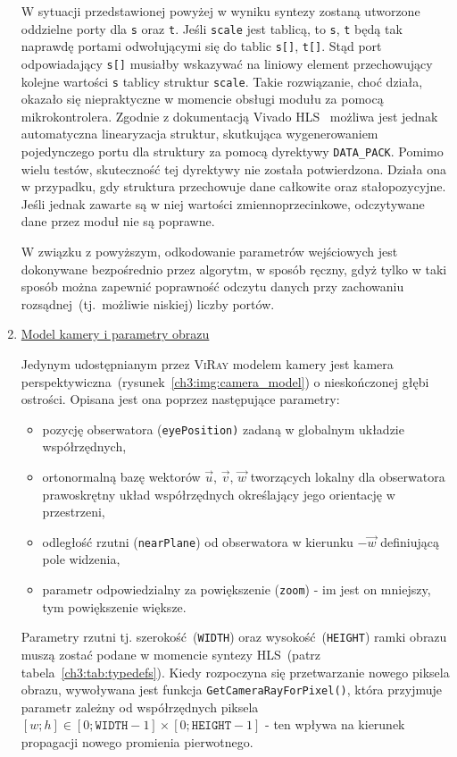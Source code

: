 \begin{enumerate}
W sytuacji przedstawionej powyżej w wyniku syntezy zostaną utworzone oddzielne porty dla \texttt{s} oraz \texttt{t}. Jeśli \texttt{scale} jest tablicą, to \texttt{s}, \texttt{t} będą tak naprawdę portami odwołującymi się do tablic \texttt{s[]}, \texttt{t[]}. Stąd port odpowiadający \texttt{s[]} musiałby wskazywać na liniowy element przechowujący kolejne wartości \texttt{s} tablicy struktur \texttt{scale}. Takie rozwiązanie, choć działa, okazało się niepraktyczne w momencie obsługi modułu za pomocą mikrokontrolera. Zgodnie z dokumentacją Vivado HLS~\cite{UG902} możliwa jest jednak automatyczna linearyzacja struktur, skutkująca wygenerowaniem pojedynczego portu dla struktury za pomocą dyrektywy \texttt{DATA\_PACK}. Pomimo wielu testów, skuteczność tej dyrektywy nie została potwierdzona. Działa ona w przypadku, gdy struktura przechowuje dane całkowite oraz stałopozycyjne. Jeśli jednak zawarte są w niej wartości zmiennoprzecinkowe, odczytywane dane przez moduł nie są poprawne. 

W związku z powyższym, odkodowanie parametrów wejściowych jest dokonywane bezpośrednio przez algorytm, w sposób ręczny, gdyż tylko w taki sposób można zapewnić poprawność odczytu danych przy zachowaniu rozsądnej~(tj.~możliwie niskiej) liczby portów.


\item \underline{Model kamery i parametry obrazu}

Jedynym udostępnianym przez \textsc{ViRay} modelem kamery jest kamera perspektywiczna~(rysunek~\ref{ch3:img:camera_model}) o nieskończonej głębi ostrości. Opisana jest ona poprzez następujące parametry:
\begin{itemize}
\item pozycję obserwatora (\texttt{eyePosition)} zadaną w globalnym układzie współrzędnych,
\item ortonormalną bazę wektorów $\vec{u}$, $\vec{v}$, $\vec{w}$ tworzących lokalny dla obserwatora prawoskrętny układ współrzędnych określający jego orientację w przestrzeni,
\item odległość rzutni (\texttt{nearPlane}) od obserwatora w kierunku $-\vec{w}$ definiującą pole widzenia,
\item parametr odpowiedzialny za powiększenie (\texttt{zoom}) - im jest on mniejszy, tym powiększenie większe.
\end{itemize}
Parametry rzutni tj. szerokość~(\texttt{WIDTH}) oraz wysokość~(\texttt{HEIGHT}) ramki obrazu muszą zostać podane w momencie syntezy HLS~(patrz tabela~\ref{ch3:tab:typedefs}). Kiedy rozpoczyna się przetwarzanie nowego piksela obrazu, wywoływana jest funkcja \texttt{GetCameraRayForPixel()}, która przyjmuje parametr zależny od współrzędnych piksela $[w; h] \in [0; \mathtt{WIDTH} - 1]\times[0; \mathtt{HEIGHT} - 1]$ - ten wpływa na kierunek propagacji nowego promienia pierwotnego.


\end{enumerate}
